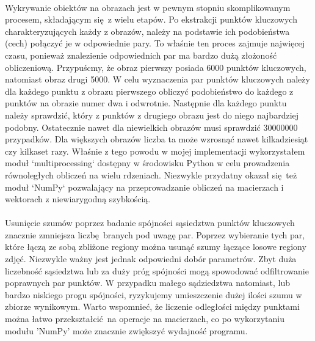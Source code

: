 \documentclass[../main.tex]{subfiles}
\begin{document}
    \paragraph{}
    Wykrywanie obiektów na obrazach jest w pewnym stopniu skomplikowanym procesem, składającym się z wielu etapów. Po ekstrakcji punktów kluczowych charakteryzujących każdy z obrazów, należy na podstawie ich podobieństwa (cech) połączyć je w odpowiednie pary. To właśnie ten proces zajmuje najwięcej czasu, ponieważ znalezienie odpowiednich par ma bardzo dużą złożoność obliczeniową. Przypuścmy, że obraz pierwszy posiada 6000 punktów kluczowych, natomiast obraz drugi 5000. W celu wyznaczenia par punktów kluczowych należy dla każdego punktu z obrazu pierwszego obliczyć podobieństwo do każdego z punktów na obrazie numer dwa i odwrotnie. Następnie dla każdego punktu należy sprawdzić, który z punktów z drugiego obrazu jest do niego najbardziej podobny. Ostatecznie nawet dla niewielkich obrazów musi sprawdzić 30000000 przypadków. Dla większych obrazów liczba ta może wzrosnąć nawet kilkadziesiąt czy kilkaset razy.
    Właśnie z tego powodu w mojej implementacji wykorzystałem moduł `multiprocessing` dostępny w środowisku Python w celu prowadzenia równoległych obliczeń na wielu rdzeniach. Niezwykle przydatny okazał się też moduł `NumPy` pozwalający na przeprowadzanie obliczeń na macierzach i wektorach z niewiarygodną szybkością. 
    
    \paragraph{}
    Usunięcie szumów poprzez badanie spójności sąsiedztwa punktów kluczowych znacznie zmniejsza liczbę branych pod uwagę par. Poprzez wybieranie tych par, które łączą ze sobą zbliżone regiony można usunąć szumy łączące losowe regiony zdjęć. Niezwykle ważny jest jednak odpowiedni dobór parametrów. Zbyt duża liczebność sąsiedztwa lub za duży próg spójności mogą spowodować odfiltrowanie poprawnych par punktów. W przypadku małego sądziedztwa natomiast, lub bardzo niskiego progu spójności, ryzykujemy umieszczenie dużej ilości szumu w zbiorze wynikowym. Warto wspomnieć, że liczenie odległości między punktami można łatwo przekształcić na operacje na macierzach, co po wykorzytaniu modułu 'NumPy' może znacznie zwiększyć wydajność programu.
    
\end{document}
